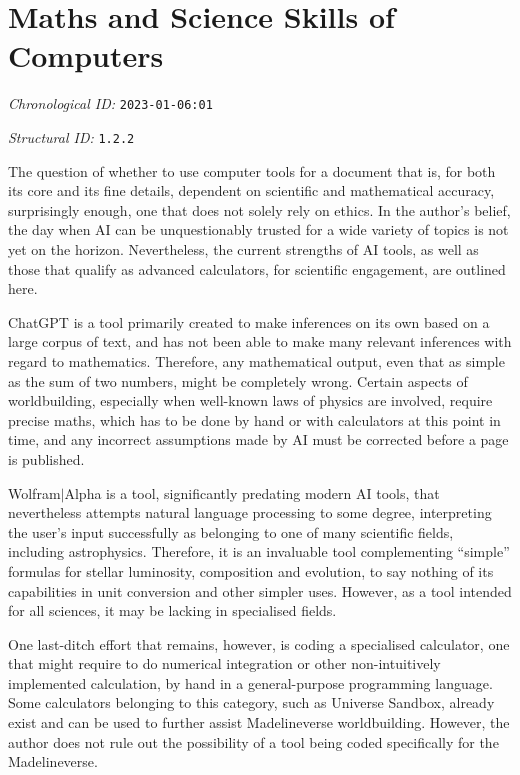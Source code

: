\section{Maths and Science Skills of Computers}
\emph{Chronological ID:} \texttt{2023-01-06:01}

\emph{Structural ID:} \texttt{1.2.2}

The question of whether to use computer tools for a document that is, for both its core and its fine details, dependent on scientific and mathematical accuracy, surprisingly enough, one that does not solely rely on ethics. In the author's belief, the day when AI can be unquestionably trusted for a wide variety of topics is not yet on the horizon. Nevertheless, the current strengths of AI tools, as well as those that qualify as advanced calculators, for scientific engagement, are outlined here.

ChatGPT is a tool primarily created to make inferences on its own based on a large corpus of text, and has not been able to make many relevant inferences with regard to mathematics. Therefore, any mathematical output, even that as simple as the sum of two numbers, might be completely wrong. Certain aspects of worldbuilding, especially when well-known laws of physics are involved, require precise maths, which has to be done by hand or with calculators at this point in time, and any incorrect assumptions made by AI must be corrected before a page is published.

Wolfram$\vert$Alpha is a tool, significantly predating modern AI tools, that nevertheless attempts natural language processing to some degree, interpreting the user's input successfully as belonging to one of many scientific fields, including astrophysics. Therefore, it is an invaluable tool complementing ``simple'' formulas for stellar luminosity, composition and evolution, to say nothing of its capabilities in unit conversion and other simpler uses. However, as a tool intended for all sciences, it may be lacking in specialised fields.

One last-ditch effort that remains, however, is coding a specialised calculator, one that might require to do numerical integration or other non-intuitively implemented calculation, by hand in a general-purpose programming language. Some calculators belonging to this category, such as Universe Sandbox, already exist and can be used to further assist Madelineverse worldbuilding. However, the author does not rule out the possibility of a tool being coded specifically for the Madelineverse.
\newpage

